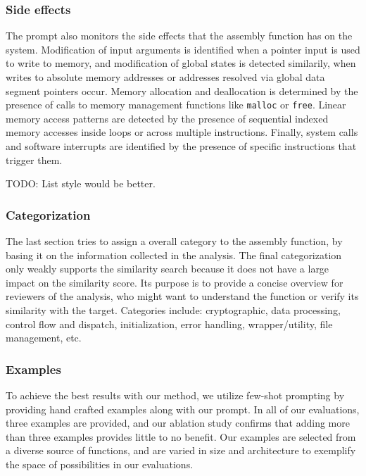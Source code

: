 \documentclass[conference,compsoc]{IEEEtran}
\begin{document}
\subsubsection{Side effects}

The prompt also monitors the side effects that the assembly function has on the system.
Modification of input arguments is identified when a pointer input is used to write to memory, and modification
of global states is detected similarily, when writes to absolute memory addresses or addresses resolved via global
data segment pointers occur. Memory allocation and deallocation is determined by the presence of calls to memory
management functions like \texttt{malloc} or \texttt{free}. Linear memory access patterns are detected by the presence of sequential
indexed memory accesses inside loops or across multiple instructions. Finally, system calls and software interrupts are
identified by the presence of specific instructions that trigger them.

TODO: List style would be better.

\subsubsection{Categorization}

The last section tries to assign a overall category to the assembly function, by basing it on the information
collected in the analysis. The final categorization only weakly supports the similarity search because it does
not have a large impact on the similarity score. Its purpose is to provide a concise overview for reviewers
of the analysis, who might want to understand the function or verify its similarity with the target.
Categories include: cryptographic, data processing, control flow and dispatch, initialization, error handling,
wrapper/utility, file management, etc.

\subsubsection{Examples}

To achieve the best results with our method, we utilize few-shot prompting by providing hand crafted examples along with our prompt.
In all of our evaluations, three examples are provided, and our ablation study confirms that adding more than three examples provides
little to no benefit. Our examples are selected from a diverse source of functions, and are varied in size and architecture to
exemplify the space of possibilities in our evaluations.
\end{document}
